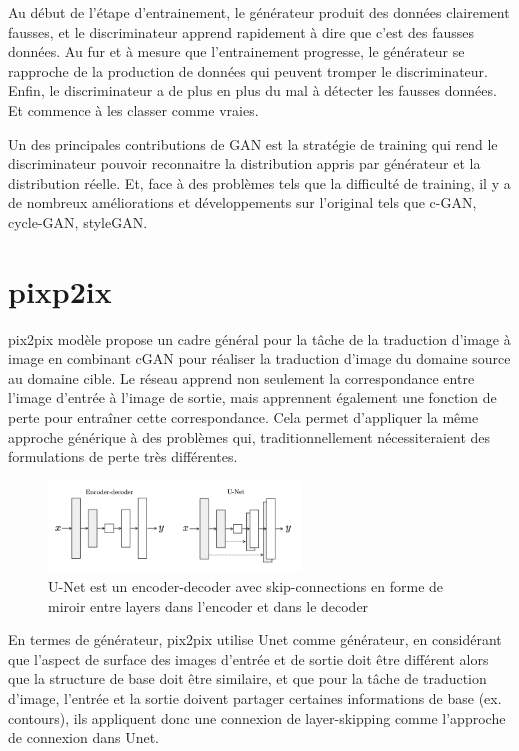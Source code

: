 Au début de l’étape d’entrainement, le générateur produit des données clairement fausses, et le discriminateur apprend rapidement à dire que c’est des fausses données.
Au fur et à mesure que l’entrainement progresse, le générateur se rapproche de la production de données qui peuvent tromper le discriminateur.
Enfin, le discriminateur a de plus en plus du mal à détecter les fausses données. Et commence à les classer comme vraies.


Un des principales contributions de GAN est la stratégie de training qui rend le discriminateur pouvoir reconnaitre la distribution appris par générateur et la distribution réelle. Et, face à des problèmes tels que la difficulté de training, il y a de nombreux améliorations et développements sur l'original tels que c-GAN, cycle-GAN, styleGAN.

\section{pixp2ix} 
pix2pix modèle propose un cadre général pour la tâche de la traduction d'image à image en combinant cGAN pour réaliser la traduction d'image du domaine source au domaine cible. Le réseau apprend non seulement la correspondance entre l'image d'entrée à l'image de sortie, mais apprennent également une fonction de perte pour entraîner cette correspondance. Cela permet d'appliquer la même approche générique à des problèmes qui, traditionnellement nécessiteraient des formulations de perte très différentes\cite{isola2017image}. 

\begin{figure}[H] 
	\centering 
	\includegraphics[width=0.6\textwidth]{./resources/img/Unet.jpg} %
	\caption{ U-Net est un encoder-decoder avec skip-connections en forme de miroir entre layers dans l'encoder et dans le decoder} %
	\label{Fig3_2} %
\end{figure}

En termes de générateur, pix2pix utilise Unet comme générateur, en considérant que l'aspect de surface des images d'entrée et de sortie doit être différent alors que la structure de base doit être similaire, et que pour la tâche de traduction d'image, l'entrée et la sortie doivent partager certaines informations de base (ex. contours), ils appliquent donc une connexion de layer-skipping comme l'approche de connexion dans Unet.

